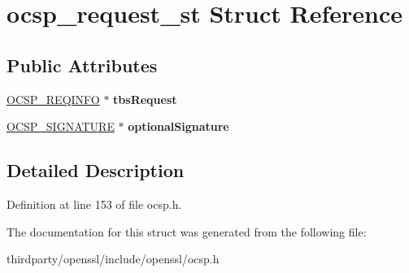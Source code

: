 \hypertarget{structocsp__request__st}{}\section{ocsp\+\_\+request\+\_\+st Struct Reference}
\label{structocsp__request__st}
\subsection*{Public Attributes}
\begin{DoxyCompactItemize}
\item 
\mbox{\label{structocsp__request__st_a743dcc34d9ff06fe9635118c0a0030c0}} 
\hyperlink{structocsp__req__info__st}{O\+C\+S\+P\+\_\+\+R\+E\+Q\+I\+N\+FO} $\ast$ {\bfseries tbs\+Request}
\item 
\mbox{\label{structocsp__request__st_a97762bfa4b2c09c1811bfe21882fce5a}} 
\hyperlink{structocsp__signature__st}{O\+C\+S\+P\+\_\+\+S\+I\+G\+N\+A\+T\+U\+RE} $\ast$ {\bfseries optional\+Signature}
\end{DoxyCompactItemize}


\subsection{Detailed Description}


Definition at line 153 of file ocsp.\+h.



The documentation for this struct was generated from the following file\+:\begin{DoxyCompactItemize}
\item 
thirdparty/openssl/include/openssl/ocsp.\+h\end{DoxyCompactItemize}
